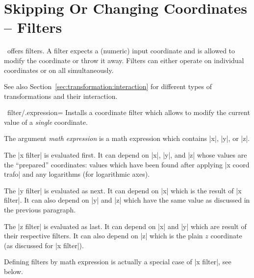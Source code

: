 \section{Skipping Or Changing Coordinates -- Filters}
\label{sec:filters}

\PGFPlots\ offers filters. A filter expects a (numeric) input coordinate and is allowed to modify the coordinate or throw it away. Filters can either operate on individual coordinates or on all simultaneously.

See also Section~\ref{sec:transformation:interaction} for different types of transformations and their interaction.

\begin{\pgfplotsxykeylist}{\x\ filter/.expression=}
	Installs a coordinate filter which allows to modify the current value of a \emph{single} coordinate.

	The argument \emph{math expression} is a math expression which contains |x|, |y|, or |z|. 
\begin{codeexample}[]
\end{codeexample}
	
	The |x filter| is evaluated first. It can depend on |x|, |y|, and |z| whose values are the ``prepared'' coordinates: values which have been found after applying |x coord trafo| and any logarithms (for logarithmic axes).

	The |y filter| is evaluated as next. It can depend on |x| which is the result of |x filter|. It can also depend on |y| and |z| which have the same value as discussed in the previous paragraph.

	The |z filter| is evaluated as last. It can depend on |x| and |y| which are result of their respective filters. It can also depend on |z| which is the plain $z$ coordinate (as discussed for |x filter|).

	Defining filters by math expression is actually a special case of |x filter|, see below.
\end{\pgfplotsxykeylist}

